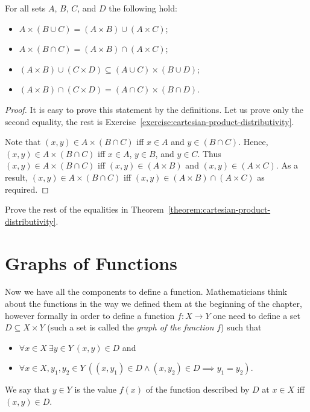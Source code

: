\begin{theorem}
\label{theorem:cartesian-product-distributivity}
    For all sets $A$, $B$, $C$, and $D$ the following hold:
    \begin{itemize}
        \item $A \times (B \cup C) = (A \times B) \cup (A \times C)$;
        \item $A \times (B \cap C) = (A \times B) \cap (A \times C)$;
        \item $(A \times B) \cup (C \times D) \subseteq
            (A \cup C) \times (B \cup D)$;
        \item $(A \times B) \cap (C \times D) =
            (A \cap C) \times (B \cap D)$.
    \end{itemize}
\end{theorem}
\begin{proof}
    It is easy to prove this statement by the definitions. Let us prove only the
    second equality, the rest is
    Exercise~\ref{exercise:cartesian-product-distributivity}.

    Note that $(x, y) \in A \times (B \cap C)$ iff $x \in A$ and
    $y \in (B \cap C)$.
    Hence, $(x, y) \in A \times (B \cap C)$ iff $x \in A$, $y \in B$, and
    $y \in C$. Thus $(x, y) \in A \times (B \cap C)$ iff
    $(x, y) \in (A \times B)$ and $(x, y) \in (A \times C)$. As a result,
    $(x, y) \in A \times (B \cap C)$ iff
    $(x, y) \in (A \times B) \cap (A \times C)$ as required.
\end{proof}


\begin{exercise}
\label{exercise:cartesian-product-distributivity}
    Prove the rest of the equalities in
    Theorem~\ref{theorem:cartesian-product-distributivity}.
\end{exercise}


\section{Graphs of Functions}
\label{section:graph}
Now we have all the components to define a function. Mathematicians think about
the functions in the way we defined them at the beginning of the chapter,
however formally in order to define a function $f : X \to Y$ one need to define
a set $D \subseteq X \times Y$ (such a set is called the \emph{graph of the
function} $f$) such that
\begin{itemize}
    \item $\forall x \in X~\exists y \in Y\ (x, y) \in D$ and
    \item $\forall x \in X, y_1, y_2 \in Y\
        ((x, y_1) \in D \land (x, y_2) \in D \implies y_1 = y_2)$.
\end{itemize}
We say that $y \in Y$ is the value $f(x)$ of the function described by $D$ at
$x \in X$ iff $(x, y) \in D$.

